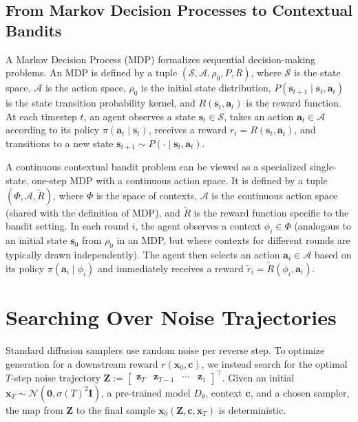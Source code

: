 \documentclass{article}
\newcommand{\calN}{\mathcal{N}} %
\newcommand{\matI}{\mathbf{I}}   %
\begin{document}
\subsection{From Markov Decision Processes to Contextual Bandits}
\label{sec:mdps_to_bandits}
%
A Markov Decision Process (MDP) formalizes sequential decision-making problems. An MDP is defined by a tuple $(\mathcal{S}, \mathcal{A}, \rho_0, P, R)$, where $\mathcal{S}$ is the state space, $\mathcal{A}$ is the action space, $\rho_0$ is the initial state distribution, $P(\mathbf{s}_{t+1} \mid \mathbf{s}_t, \mathbf{a}_t)$ is the state transition probability kernel, and $R(\mathbf{s}_t, \mathbf{a}_t)$ is the reward function. At each timestep $t$, an agent observes a state $\mathbf{s}_t \in \mathcal{S}$, takes an action $\mathbf{a}_t \in \mathcal{A}$ according to its policy $\pi(\mathbf{a}_t \mid \mathbf{s}_t)$, receives a reward $r_t = R(\mathbf{s}_t, \mathbf{a}_t)$, and transitions to a new state $\mathbf{s}_{t+1} \sim P(\cdot \mid \mathbf{s}_t, \mathbf{a}_t)$.

A continuous contextual bandit problem can be viewed as a specialized single-state, one-step MDP with a continuous action space. It is defined by a tuple $(\Phi, \mathcal{A}, \tilde{R})$, where $\Phi$ is the space of contexts, $\mathcal{A}$ is the continuous action space (shared with the definition of MDP), and $\tilde{R}$ is the reward function specific to the bandit setting. In each round $i$, the agent observes a context $\phi_i \in \Phi$ (analogous to an initial state $\mathbf{s}_0$ from $\rho_0$ in an MDP, but where contexts for different rounds are typically drawn independently). The agent then selects an action $\mathbf{a}_i \in \mathcal{A}$ based on its policy $\pi(\mathbf{a}_i \mid \phi_i)$ and immediately receives a reward $\tilde{r}_i = \tilde{R}(\phi_i, \mathbf{a}_i)$. 





\section{Searching Over Noise Trajectories}
\label{sec:searching_noise}
%
Standard diffusion samplers use random noise per reverse step. To optimize generation for a downstream reward $r(\mathbf{x}_0, \mathbf{c})$, we instead search for the optimal $T$-step noise trajectory $\mathbf{Z} := \begin{bmatrix}\mathbf{z}_T & \mathbf{z}_{T-1}& \cdots & \mathbf{z}_1\end{bmatrix}^\top$. Given an initial $\mathbf{x}_T \sim \calN(\mathbf{0}, \sigma(T)^2\matI)$, a pre-trained model $D_\theta$, context $\mathbf{c}$, and a chosen sampler, the map from $\mathbf{Z}$ to the final sample $\mathbf{x}_0(\mathbf{Z}, \mathbf{c}, \mathbf{x}_T)$ is deterministic. 
\end{document}
